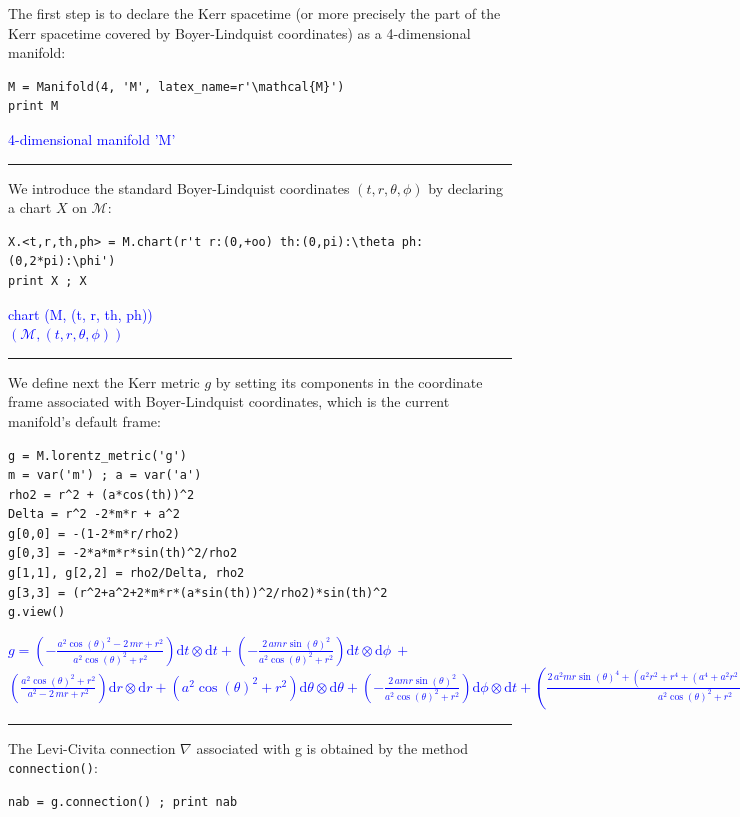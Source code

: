 \documentclass[a4paper]{jpconf}
\newcommand{\code}[1]{\texttt{#1}}
\newcommand{\soutput}[1]{\textcolor{blue}{#1}\\[-0.8ex]\rule{\textwidth}{0.4pt}}
\begin{document}
The first step is to declare the Kerr spacetime (or more precisely the part of the Kerr spacetime covered by Boyer-Lindquist coordinates) as a 4-dimensional manifold:
\begin{verbatim}
M = Manifold(4, 'M', latex_name=r'\mathcal{M}')
print M
\end{verbatim}
\soutput{4-dimensional manifold 'M'}
We introduce the standard Boyer-Lindquist coordinates $(t,r,\theta,\phi)$
by declaring a chart $X$ on $\mathcal{M}$:
\begin{verbatim}
X.<t,r,th,ph> = M.chart(r't r:(0,+oo) th:(0,pi):\theta ph:(0,2*pi):\phi') 
print X ; X
\end{verbatim}
\soutput{chart (M, (t, r, th, ph))\\
$(\mathcal{M},(t, r, \theta, \phi))$}
We define next the Kerr metric $g$ by setting its components in the 
coordinate frame associated with Boyer-Lindquist coordinates, 
which is the current manifold's default frame:
\begin{verbatim}
g = M.lorentz_metric('g')
m = var('m') ; a = var('a')
rho2 = r^2 + (a*cos(th))^2
Delta = r^2 -2*m*r + a^2
g[0,0] = -(1-2*m*r/rho2)
g[0,3] = -2*a*m*r*sin(th)^2/rho2
g[1,1], g[2,2] = rho2/Delta, rho2
g[3,3] = (r^2+a^2+2*m*r*(a*sin(th))^2/rho2)*sin(th)^2
g.view()
\end{verbatim}
\soutput{$\displaystyle g = \left( -\frac{a^{2} \cos\left(\theta\right)^{2} - 2 \, m r +
r^{2}}{a^{2} \cos\left(\theta\right)^{2} + r^{2}} \right) \mathrm{d}
t\otimes \mathrm{d} t + \left( -\frac{2 \, a m r
\sin\left(\theta\right)^{2}}{a^{2} \cos\left(\theta\right)^{2} + r^{2}}
\right) \mathrm{d} t\otimes \mathrm{d} \phi \ + $\\
$\displaystyle \left( \frac{a^{2}
\cos\left(\theta\right)^{2} + r^{2}}{a^{2} - 2 \, m r + r^{2}} \right)
\mathrm{d} r\otimes \mathrm{d} r + \left( a^{2}
\cos\left(\theta\right)^{2} + r^{2} \right) \mathrm{d} \theta\otimes
\mathrm{d} \theta + \left( -\frac{2 \, a m r
\sin\left(\theta\right)^{2}}{a^{2} \cos\left(\theta\right)^{2} + r^{2}}
\right) \mathrm{d} \phi\otimes \mathrm{d} t + \left( \frac{2 \, a^{2} m
r \sin\left(\theta\right)^{4} + {\left(a^{2} r^{2} + r^{4} +
{\left(a^{4} + a^{2} r^{2}\right)} \cos\left(\theta\right)^{2}\right)}
\sin\left(\theta\right)^{2}}{a^{2} \cos\left(\theta\right)^{2} + r^{2}}
\right) \mathrm{d} \phi\otimes \mathrm{d} \phi $}
The Levi-Civita connection $\nabla$ associated with g is obtained
by the method \code{connection()}:
\begin{verbatim}
nab = g.connection() ; print nab
\end{verbatim}
\end{document}
